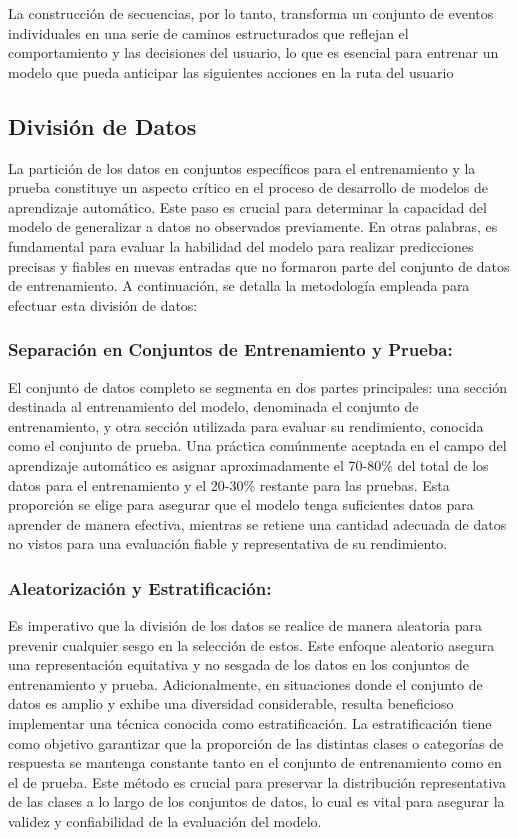 La construcción de secuencias, por lo tanto, transforma un conjunto de eventos individuales en una serie de caminos estructurados que reflejan el comportamiento y las decisiones del usuario, lo que es esencial para entrenar un modelo que pueda anticipar las siguientes acciones en la ruta del usuario

\subsection{División de Datos}
La partición de los datos en conjuntos específicos para el entrenamiento y la prueba constituye un aspecto crítico en el proceso de desarrollo de modelos de aprendizaje automático. Este paso es crucial para determinar la capacidad del modelo de generalizar a datos no observados previamente. En otras palabras, es fundamental para evaluar la habilidad del modelo para realizar predicciones precisas y fiables en nuevas entradas que no formaron parte del conjunto de datos de entrenamiento. A continuación, se detalla la metodología empleada para efectuar esta división de datos:

\subsubsection{Separación en Conjuntos de Entrenamiento y Prueba:}
El conjunto de datos completo se segmenta en dos partes principales: una sección destinada al entrenamiento del modelo, denominada el conjunto de entrenamiento, y otra sección utilizada para evaluar su rendimiento, conocida como el conjunto de prueba. Una práctica comúnmente aceptada en el campo del aprendizaje automático es asignar aproximadamente el 70-80\% del total de los datos para el entrenamiento y el 20-30\% restante para las pruebas. Esta proporción se elige para asegurar que el modelo tenga suficientes datos para aprender de manera efectiva, mientras se retiene una cantidad adecuada de datos no vistos para una evaluación fiable y representativa de su rendimiento.

\subsubsection{Aleatorización y Estratificación:}
Es imperativo que la división de los datos se realice de manera aleatoria para prevenir cualquier sesgo en la selección de estos. Este enfoque aleatorio asegura una representación equitativa y no sesgada de los datos en los conjuntos de entrenamiento y prueba. Adicionalmente, en situaciones donde el conjunto de datos es amplio y exhibe una diversidad considerable, resulta beneficioso implementar una técnica conocida como estratificación. La estratificación tiene como objetivo garantizar que la proporción de las distintas clases o categorías de respuesta se mantenga constante tanto en el conjunto de entrenamiento como en el de prueba. Este método es crucial para preservar la distribución representativa de las clases a lo largo de los conjuntos de datos, lo cual es vital para asegurar la validez y confiabilidad de la evaluación del modelo.

